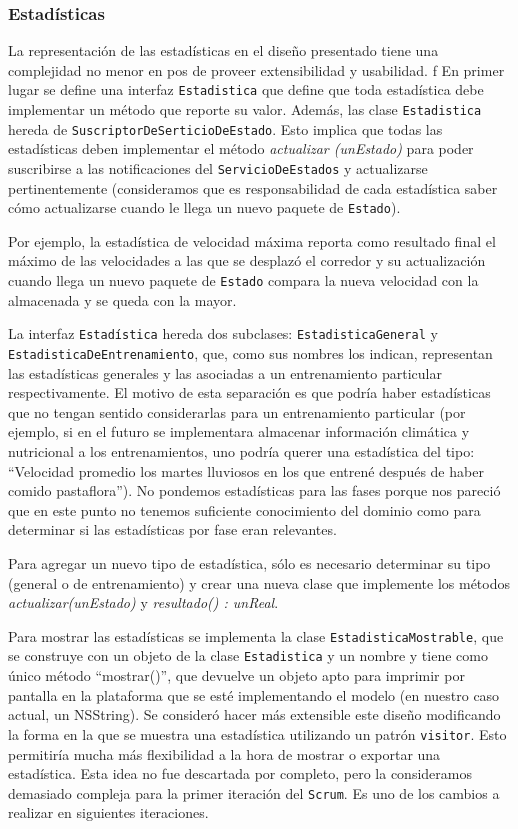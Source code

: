 \documentclass[10pt, a4paper,english,spanish]{article}
\renewcommand{\emph}[1]{\textit{#1}}
\begin{document}
\subsubsection{Estadísticas}
La representación de las estadísticas en el diseño presentado tiene una complejidad no menor en pos de proveer extensibilidad y usabilidad. 
f
En primer lugar se define una interfaz \texttt{Estadistica} que define que toda estadística debe implementar un método que reporte su valor. Además, las clase \texttt{Estadistica} hereda de \texttt{SuscriptorDeSerticioDeEstado}. Esto implica que todas las estadísticas deben implementar el método \emph{actualizar (unEstado)} para poder suscribirse a las notificaciones del \texttt{ServicioDeEstados} y actualizarse pertinentemente (consideramos que es responsabilidad de cada estadística saber cómo actualizarse cuando le llega un nuevo paquete de \texttt{Estado}). 

Por ejemplo, la estadística de velocidad máxima reporta como resultado final el máximo de las velocidades a las que se desplazó el corredor y su actualización cuando llega un nuevo paquete de \texttt{Estado} compara la nueva velocidad con la almacenada y se queda con la mayor. 

La interfaz \texttt{Estadística} hereda dos subclases: \texttt{EstadisticaGeneral} y \texttt{EstadisticaDeEntrenamiento}, que, como sus nombres los indican, representan las estadísticas generales y las asociadas a un entrenamiento particular respectivamente. El motivo de esta separación es que podría haber estadísticas que no tengan sentido considerarlas para un entrenamiento particular (por ejemplo, si en el futuro se implementara almacenar información climática y nutricional a los entrenamientos, uno podría querer una estadística del tipo: ``Velocidad promedio los martes lluviosos en los que entrené después de haber comido pastaflora''). No pondemos estadísticas para las fases porque nos pareció que en este punto no tenemos suficiente conocimiento del dominio como para determinar si las estadísticas por fase eran relevantes.

Para agregar un nuevo tipo de estadística, sólo es necesario determinar su tipo (general o de entrenamiento) y crear una nueva clase que implemente los métodos \emph{actualizar(unEstado)} y \emph{resultado() : unReal}.

Para mostrar las estadísticas se implementa la clase \texttt{EstadisticaMostrable}, que se construye con un objeto de la clase \texttt{Estadistica} y un nombre y tiene como único método ``mostrar()'', que devuelve un objeto apto para imprimir por pantalla en la plataforma que se esté implementando el modelo (en nuestro caso actual, un NSString). Se consideró hacer más extensible este diseño modificando la forma en la que se muestra una estadística utilizando un patrón \texttt{visitor}. Esto permitiría mucha más flexibilidad a la hora de mostrar o exportar una estadística. Esta idea no fue descartada por completo, pero la consideramos demasiado compleja para la primer iteración del \texttt{Scrum}. Es uno de los cambios a realizar en siguientes iteraciones.
\end{document}
